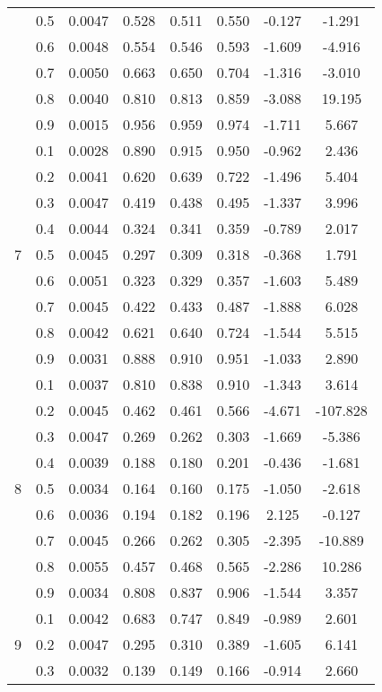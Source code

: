 \documentclass[11pt,a4paper]{report}
\begin{document}
\begin{longtable}{ | c | c || c | c | c | c | c | c | }
 & 0.5 & 0.0047 & 0.528 & 0.511 & 0.550 & -0.127 & -1.291 \\
 & 0.6 & 0.0048 & 0.554 & 0.546 & 0.593 & -1.609 & -4.916 \\
 & 0.7 & 0.0050 & 0.663 & 0.650 & 0.704 & -1.316 & -3.010 \\
 & 0.8 & 0.0040 & 0.810 & 0.813 & 0.859 & -3.088 & 19.195 \\
 & 0.9 & 0.0015 & 0.956 & 0.959 & 0.974 & -1.711 & 5.667 \\
 \hline
\multirow{9}{*}{7} & 0.1 & 0.0028 & 0.890 & 0.915 & 0.950 & -0.962 & 2.436 \\
 & 0.2 & 0.0041 & 0.620 & 0.639 & 0.722 & -1.496 & 5.404 \\
 & 0.3 & 0.0047 & 0.419 & 0.438 & 0.495 & -1.337 & 3.996 \\
 & 0.4 & 0.0044 & 0.324 & 0.341 & 0.359 & -0.789 & 2.017 \\
 & 0.5 & 0.0045 & 0.297 & 0.309 & 0.318 & -0.368 & 1.791 \\
 & 0.6 & 0.0051 & 0.323 & 0.329 & 0.357 & -1.603 & 5.489 \\
 & 0.7 & 0.0045 & 0.422 & 0.433 & 0.487 & -1.888 & 6.028 \\
 & 0.8 & 0.0042 & 0.621 & 0.640 & 0.724 & -1.544 & 5.515 \\
 & 0.9 & 0.0031 & 0.888 & 0.910 & 0.951 & -1.033 & 2.890 \\
 \hline
\multirow{9}{*}{8} & 0.1 & 0.0037 & 0.810 & 0.838 & 0.910 & -1.343 & 3.614 \\
 & 0.2 & 0.0045 & 0.462 & 0.461 & 0.566 & -4.671 & -107.828 \\
 & 0.3 & 0.0047 & 0.269 & 0.262 & 0.303 & -1.669 & -5.386 \\
 & 0.4 & 0.0039 & 0.188 & 0.180 & 0.201 & -0.436 & -1.681 \\
 & 0.5 & 0.0034 & 0.164 & 0.160 & 0.175 & -1.050 & -2.618 \\
 & 0.6 & 0.0036 & 0.194 & 0.182 & 0.196 & 2.125 & -0.127 \\
 & 0.7 & 0.0045 & 0.266 & 0.262 & 0.305 & -2.395 & -10.889 \\
 & 0.8 & 0.0055 & 0.457 & 0.468 & 0.565 & -2.286 & 10.286 \\
 & 0.9 & 0.0034 & 0.808 & 0.837 & 0.906 & -1.544 & 3.357 \\
 \hline
\multirow{9}{*}{9} & 0.1 & 0.0042 & 0.683 & 0.747 & 0.849 & -0.989 & 2.601 \\
 & 0.2 & 0.0047 & 0.295 & 0.310 & 0.389 & -1.605 & 6.141 \\
 & 0.3 & 0.0032 & 0.139 & 0.149 & 0.166 & -0.914 & 2.660 \\

\end{longtable}
\end{document}
